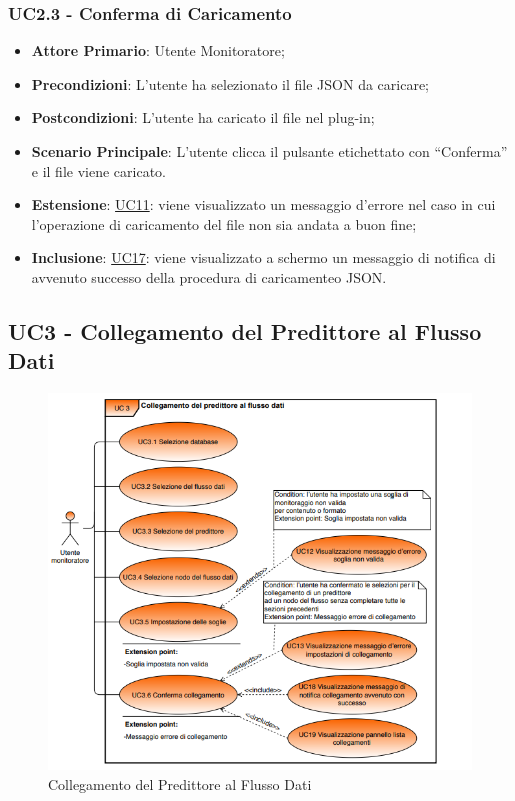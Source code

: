 		\subsubsection{UC2.3 - Conferma di Caricamento}
		\begin{itemize}
			\item\textbf{Attore Primario}: Utente Monitoratore;
			\item\textbf{Precondizioni}: L’utente ha selezionato il file JSON da caricare;
			\item\textbf{Postcondizioni}: L’utente ha caricato il file nel plug-in; 
			\item\textbf{Scenario Principale}: L’utente clicca il pulsante etichettato con “Conferma” e il file viene caricato.
			\item\textbf{Estensione}: \hyperref[par:UC11]{UC11}: viene visualizzato un messaggio d’errore nel caso in cui l’operazione di caricamento del file non sia andata a buon fine;				
			\item\textbf{Inclusione}: \hyperref[par:UC17]{UC17}: viene visualizzato a schermo un messaggio di notifica di avvenuto successo della procedura di caricamenteo JSON.	
		\end{itemize}


	\label{par:UC3}
	\subsection{UC3 - Collegamento del Predittore al Flusso Dati}

		\begin{figure}[H]
		\centering
		\includegraphics[scale=0.70]{../Analisi_dei_requisiti/img/Diagrammi_UML/UC3_collegamento_flusso_dati.png}
		\caption{Collegamento del Predittore al Flusso Dati}
		\end{figure}	

